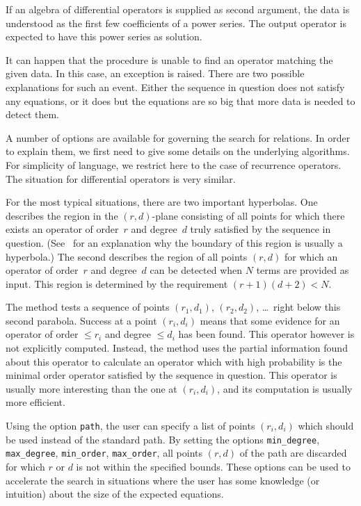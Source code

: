 \documentclass{amsart}
\begin{document}
If an algebra of differential operators is supplied as second argument, the data
is understood as the first few coefficients of a power series. The output
operator is expected to have this power series as solution.

It can happen that the procedure is unable to find an operator matching the 
given data. In this case, an exception is raised. There are two possible 
explanations for such an event. Either the sequence in question does not 
satisfy any equations, or it does but the equations are so big that more
data is needed to detect them. 

A number of options are available for governing the search for relations.  In
order to explain them, we first need to give some details on the underlying
algorithms. For simplicity of language, we restrict here to the case of
recurrence operators. The situation for differential operators is very similar.

For the most typical situations, there are two important hyperbolas. One
describes the region in the $(r,d)$-plane consisting of all points for which
there exists an operator of order~$r$ and degree~$d$ truly satisfied by the
sequence in question. (See~\cite{jaroschek13a} for an explanation why the
boundary of this region is usually a hyperbola.) The second describes the region
of all points $(r,d)$ for which an operator of order~$r$ and degree~$d$ can be
detected when $N$ terms are provided as input. This region is determined by the
requirement $(r+1)(d+2)<N$.

The method tests a sequence of points $(r_1,d_1)$, $(r_2,d_2)$, \dots\ right
below this second parabola. Success at a point $(r_i,d_i)$ means that some
evidence for an operator of order $\leq r_i$ and degree $\leq d_i$ has been found. 
This operator however is not explicitly computed. Instead, the method uses the
partial information found about this operator to calculate an operator which with 
high probability is the minimal order operator satisfied by the sequence in question. 
This operator is usually more interesting than the one at $(r_i,d_i)$, and its 
computation is usually more efficient. 

Using the option \verb|path|, the user can specify a list of points $(r_i,d_i)$
which should be used instead of the standard path. By setting the options \verb|min_degree|,
\verb|max_degree|, \verb|min_order|, \verb|max_order|, all points $(r,d)$ of the path
are discarded for which $r$ or $d$ is not within the specified bounds. These options
can be used to accelerate the search in situations where the user has some knowledge
(or intuition) about the size of the expected equations. 
\end{document}
